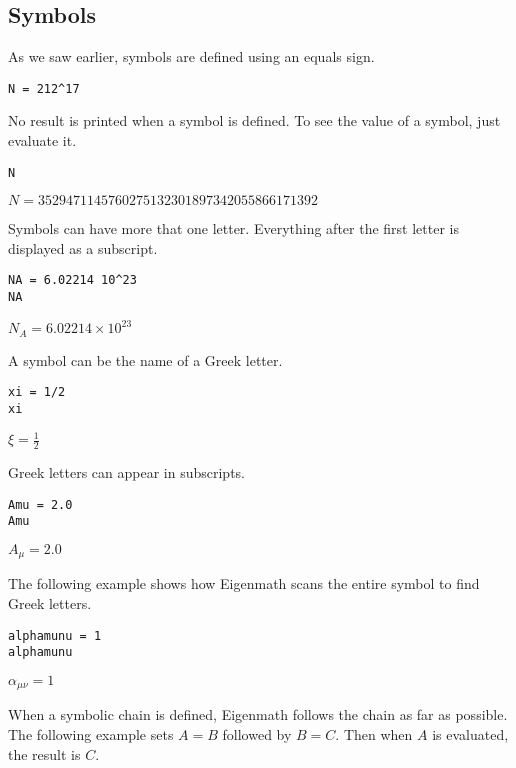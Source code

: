 \subsection{Symbols}

As we saw earlier, symbols are defined using an equals sign.

\begin{Verbatim}[formatcom=\color{blue}]
N = 212^17
\end{Verbatim}

\noindent
No result is printed when a symbol is defined.
To see the value of a symbol, just evaluate it.

\begin{Verbatim}[formatcom=\color{blue}]
N
\end{Verbatim}

\noindent
$\displaystyle N=3529471145760275132301897342055866171392$

\bigskip
\noindent
Symbols can have more that one letter.
Everything after the first letter is displayed as a subscript.

\begin{Verbatim}[formatcom=\color{blue}]
NA = 6.02214 10^23
NA
\end{Verbatim}

\noindent
$\displaystyle N_A=6.02214\times10^{23}$

\bigskip
\noindent
A symbol can be the name of a Greek letter.

\begin{Verbatim}[formatcom=\color{blue}]
xi = 1/2
xi
\end{Verbatim}

\noindent
$\displaystyle \xi=\frac{1}{2}$

\bigskip
\noindent
Greek letters can appear in subscripts.

\begin{Verbatim}[formatcom=\color{blue}]
Amu = 2.0
Amu
\end{Verbatim}

\noindent
$\displaystyle A_\mu=2.0$

\bigskip
\noindent
The following example shows how
Eigenmath scans the entire symbol to find Greek letters.

\begin{Verbatim}[formatcom=\color{blue}]
alphamunu = 1
alphamunu
\end{Verbatim}

\noindent
$\displaystyle \alpha_{\mu\nu}=1$

\bigskip
\noindent
When a symbolic chain is defined,
Eigenmath follows the chain as far as possible.
The following example sets $A=B$ followed by $B=C$.
Then when $A$ is evaluated, the result is $C$.

